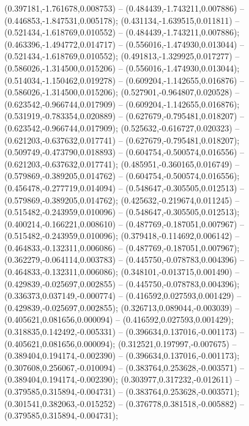  (0.397181,-1.761678,0.008753) -- (0.484439,-1.743211,0.007886) -- (0.446853,-1.847531,0.005178);
 (0.431134,-1.639515,0.011811) -- (0.521434,-1.618769,0.010552) -- (0.484439,-1.743211,0.007886);
 (0.463396,-1.494772,0.014717) -- (0.556016,-1.474930,0.013044) -- (0.521434,-1.618769,0.010552);
 (0.491813,-1.329925,0.017277) -- (0.586026,-1.314500,0.015206) -- (0.556016,-1.474930,0.013044);
 (0.514034,-1.150462,0.019278) -- (0.609204,-1.142655,0.016876) -- (0.586026,-1.314500,0.015206);
 (0.527901,-0.964807,0.020528) -- (0.623542,-0.966744,0.017909) -- (0.609204,-1.142655,0.016876);
 (0.531919,-0.783354,0.020889) -- (0.627679,-0.795481,0.018207) -- (0.623542,-0.966744,0.017909);
 (0.525632,-0.616727,0.020323) -- (0.621203,-0.637632,0.017741) -- (0.627679,-0.795481,0.018207);
 (0.509749,-0.473790,0.018893) -- (0.604754,-0.500574,0.016556) -- (0.621203,-0.637632,0.017741);
 (0.485951,-0.360165,0.016749) -- (0.579869,-0.389205,0.014762) -- (0.604754,-0.500574,0.016556);
 (0.456478,-0.277719,0.014094) -- (0.548647,-0.305505,0.012513) -- (0.579869,-0.389205,0.014762);
 (0.425632,-0.219674,0.011245) -- (0.515482,-0.243959,0.010096) -- (0.548647,-0.305505,0.012513);
 (0.400214,-0.166221,0.008610) -- (0.487769,-0.187051,0.007967) -- (0.515482,-0.243959,0.010096);
 (0.379418,-0.114692,0.006142) -- (0.464833,-0.132311,0.006086) -- (0.487769,-0.187051,0.007967);
 (0.362279,-0.064114,0.003783) -- (0.445750,-0.078783,0.004396) -- (0.464833,-0.132311,0.006086);
 (0.348101,-0.013715,0.001490) -- (0.429839,-0.025697,0.002855) -- (0.445750,-0.078783,0.004396);
 (0.336373,0.037149,-0.000774) -- (0.416592,0.027593,0.001429) -- (0.429839,-0.025697,0.002855);
 (0.326713,0.089044,-0.003039) -- (0.405621,0.081656,0.000094) -- (0.416592,0.027593,0.001429);
 (0.318835,0.142492,-0.005331) -- (0.396634,0.137016,-0.001173) -- (0.405621,0.081656,0.000094);
 (0.312521,0.197997,-0.007675) -- (0.389404,0.194174,-0.002390) -- (0.396634,0.137016,-0.001173);
 (0.307608,0.256067,-0.010094) -- (0.383764,0.253628,-0.003571) -- (0.389404,0.194174,-0.002390);
 (0.303977,0.317232,-0.012611) -- (0.379585,0.315894,-0.004731) -- (0.383764,0.253628,-0.003571);
 (0.301541,0.382063,-0.015252) -- (0.376778,0.381518,-0.005882) -- (0.379585,0.315894,-0.004731);
